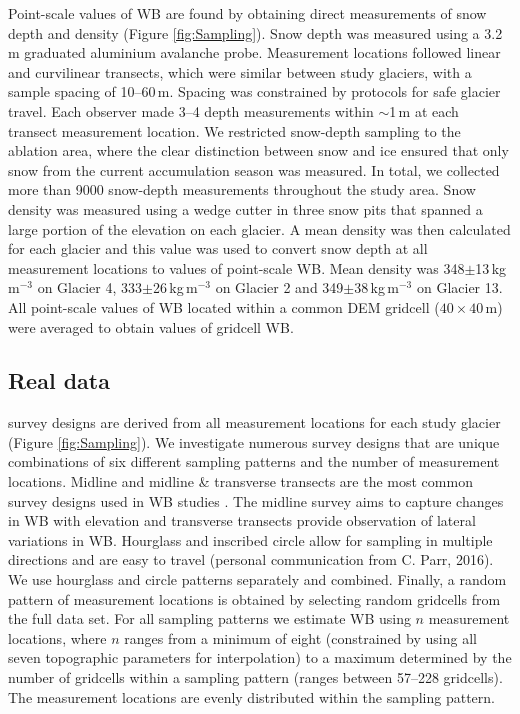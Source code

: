\documentclass[twocolumn,letterpaper]{igs}
\begin{document}
Point-scale values of WB are found by obtaining direct measurements of snow depth and density (Figure \ref{fig:Sampling}). Snow depth was measured using a 3.2\,m graduated aluminium avalanche probe. Measurement locations followed linear and curvilinear transects, which were similar between study glaciers, with a sample spacing of 10--60\,m.  Spacing was constrained by protocols for safe glacier travel. Each observer made 3--4 depth measurements within $\sim$1\,m at each transect measurement location. We restricted snow-depth sampling to the ablation area, where the clear distinction between snow and ice ensured that only snow from the current accumulation season was measured. In total, we collected more than 9000 snow-depth measurements throughout the study area. Snow density was measured using a wedge cutter in three snow pits that spanned a large portion of the elevation on each glacier. A mean density was then calculated for each glacier and this value was used to convert snow depth at all measurement locations to values of point-scale WB. Mean density was 348$\pm$13\,kg\,m$^{-3}$ on Glacier 4, 333$\pm$26\,kg\,m$^{-3}$ on Glacier 2 and 349$\pm$38\,kg\,m$^{-3}$ on Glacier 13. All point-scale values of WB located within a common DEM gridcell ($40\times40$\,m) were averaged to obtain values of gridcell WB. 

\subsection{Real data}

survey designs are derived from all measurement locations for each study glacier (Figure \ref{fig:Sampling}). We investigate numerous survey designs that are unique combinations of six different sampling patterns and the number of measurement locations. Midline and midline \& transverse transects are the most common survey designs used in WB studies \citep[e.g.][]{Kaser2002, Machguth2006}. The midline survey aims to capture changes in WB with elevation and transverse transects provide observation of lateral variations in WB. Hourglass and inscribed circle allow for sampling in multiple directions and are easy to travel (personal communication from C. Parr, 2016). We use hourglass and circle patterns separately and combined. Finally, a random pattern of measurement locations is obtained by selecting random gridcells from the full data set. For all sampling patterns we estimate WB using $n$ measurement locations, where $n$ ranges from a minimum of eight (constrained by using all seven topographic parameters for interpolation) to a maximum determined by the number of gridcells within a sampling pattern (ranges between 57--228 gridcells). The measurement locations are evenly distributed within the sampling pattern. 
\end{document}
